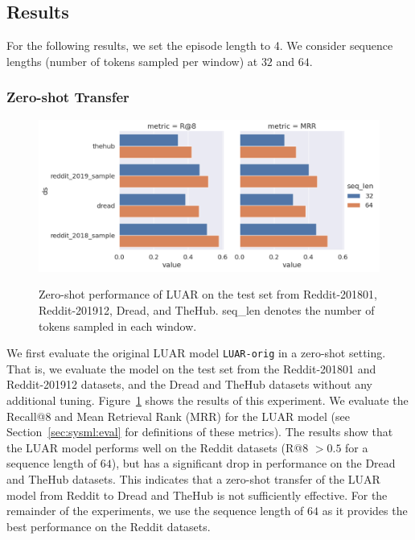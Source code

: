 \subsection{Results}

For the following results, we set the episode length to 4. We consider sequence lengths (number of tokens sampled per window) at $32$ and $64$.

\subsubsection{Zero-shot Transfer}
\begin{figure}
    \centering
    \includegraphics[width=0.9\linewidth,alt={Bar charts comparing LUAR in a zero-shot setting.}]{stylometryExtensions/figures/results/rq1_zeroshot} 
    \caption{Zero-shot performance of LUAR on the test set from Reddit-201801, Reddit-201912, Dread, and TheHub. seq\_len denotes the number of tokens sampled in each window.}
    \label{fig:stylometry_extensions:followingTrail:results:rq1_zeroshot}   
\end{figure}
We first evaluate the original LUAR model \texttt{LUAR-orig} in a zero-shot setting.
That is, we evaluate the model on the test set from the Reddit-201801 and Reddit-201912 datasets, and the Dread and TheHub datasets without any additional tuning.
Figure~\ref{fig:stylometry_extensions:followingTrail:results:rq1_zeroshot} shows the results of this experiment.
We evaluate the Recall@8 and Mean Retrieval Rank (MRR) for the LUAR model (see Section~\ref{sec:sysml:eval} for definitions of these metrics).
The results show that the LUAR model performs well on the Reddit datasets (R@8 $>0.5$ for a sequence length of $64$), but has a significant drop in performance on the Dread and TheHub datasets.
This indicates that a zero-shot transfer of the LUAR model from Reddit to Dread and TheHub is not sufficiently effective.
For the remainder of the experiments, we use the sequence length of $64$ as it provides the best performance on the Reddit datasets.

